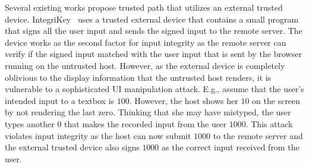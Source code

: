

 Several existing works propose trusted path that utilizes an external trusted device. IntegriKey~\cite{IntegriKey} uses a trusted external device that contains a small program that signs all the user input and sends the signed input to the remote server. The device works as the second factor for input integrity as the remote server can verify if the signed input matched with the user input that is sent by the browser running on the untrusted host. However, as the external device is completely oblivious to the display information that the untrusted host renders, it is vulnerable to a sophisticated UI manipulation attack. E.g., assume that the user's intended input to a textbox is $100$. However, the host shows her $10$ on the screen by not rendering the last zero. Thinking that she may have mistyped, the user types another $0$ that makes the recorded input from the user $1000$. This attack violates input integrity as the host can now submit $1000$ to the remote server and the external trusted device also signs $1000$ as the correct input received from the user.



